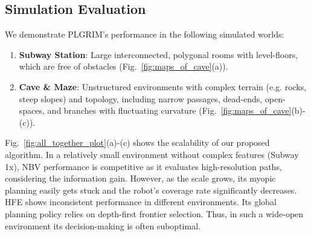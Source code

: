 \documentclass[letterpaper]{article} %
\begin{document}


\subsection{Simulation Evaluation}

We demonstrate PLGRIM's performance in the following simulated worlds:
\vspace{0pt}
\begin{enumerate}[label={\arabic*)}]
  \setlength{\itemsep}{0pt}
  \setlength{\parskip}{0pt}
  \item \textbf{Subway Station}: Large interconnected, polygonal rooms with level-floors, which are free of obstacles (Fig.~\ref{fig:maps_of_cave}(a)). 
  \item \textbf{Cave \& Maze}: Unstructured environments with complex terrain (e.g. rocks, steep slopes) and topology, including narrow passages, dead-ends, open-spaces, and branches with fluctuating curvature (Fig.~\ref{fig:maps_of_cave}(b)-(c)). 
\end{enumerate}
\vspace{-3pt}
\noindent
Fig.~\ref{fig:all_together_plot}(a)-(c) shows the scalability of our proposed algorithm. 
In a relatively small environment without complex features (Subway 1x), NBV performance is competitive as it evaluates high-resolution paths, considering the information gain.
However, as the scale grows, its myopic planning easily gets stuck and the robot's coverage rate significantly decreases. 
HFE shows inconsistent performance in different environments.
Its global planning policy relies on depth-first frontier selection. Thus, in such a wide-open environment its decision-making is often suboptimal.
%
\end{document}
